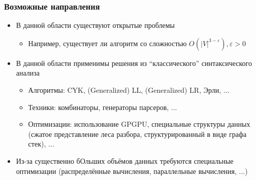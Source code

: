 \documentclass[xcolor=table,aspectratio=169]{beamer}
\begin{document}
\begin{frame}[fragile]
  \transwipe[direction=90]
  \frametitle{Возможные направления}
  \begin{itemize}
  \item В данной области существуют открытые проблемы
    \begin{itemize}
        \item Например, существует ли алгоритм со сложностью $O(|V|^{3-\varepsilon}), \varepsilon > 0$
    \end{itemize}
  \item В данной области применимы решения из ``классического'' синтаксического анализа
    \begin{itemize}
        \item Алгоритмы: CYK, (Generalized) LL, (Generalized) LR, Эрли, ...
        \item Техники: комбинаторы, генераторы парсеров, ... 
        \item Оптимизации: использование GPGPU, специальные структуры данных (сжатое представление леса разбора, структурированный в виде графа стек), ...
    \end{itemize}
  \item Из-за существенно бОльших объёмов данных требуются специальные оптимизации (распределённые вычисления, параллельные вычисления, ...)
  \end{itemize}

\end{frame}
\end{document}
